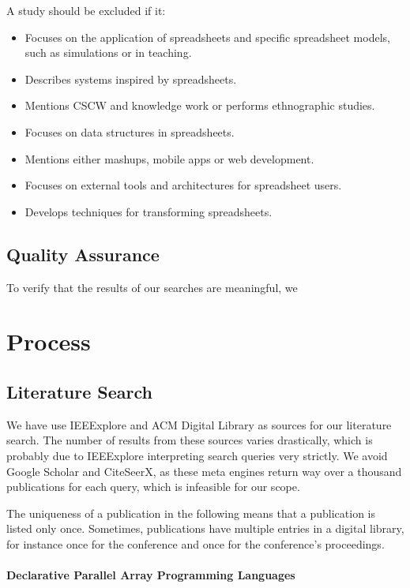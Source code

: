 \documentclass[a4paper]{article}
\begin{document}
A study should be excluded if it:

\begin{itemize}
\item Focuses on the application of spreadsheets and specific
  spreadsheet models, such as simulations or in teaching.
\item Describes systems inspired by spreadsheets.
\item Mentions CSCW and knowledge work or performs ethnographic
  studies.
\item Focuses on data structures in spreadsheets.
\item Mentions either mashups, mobile apps or web development.
\item Focuses on external tools and architectures for spreadsheet
  users.
\item Develops techniques for transforming spreadsheets.
\end{itemize}

\subsection{Quality Assurance}
\label{sec:quality-assurance}

To verify that the results of our searches are meaningful, we

\section{Process}
\label{sec:process}

\subsection{Literature Search}
\label{sec:literature-search}

We have use IEEExplore and ACM Digital Library as sources for our
literature search. The number of results from these sources varies
drastically, which is probably due to IEEExplore interpreting search
queries very strictly. We avoid Google Scholar and CiteSeerX, as these
meta engines return way over a thousand publications for each query,
which is infeasible for our scope.

The uniqueness of a publication in the following means that a
publication is listed only once. Sometimes, publications have multiple
entries in a digital library, for instance once for the conference and
once for the conference's proceedings.

\paragraph{Declarative Parallel Array Programming Languages}
\end{document}
